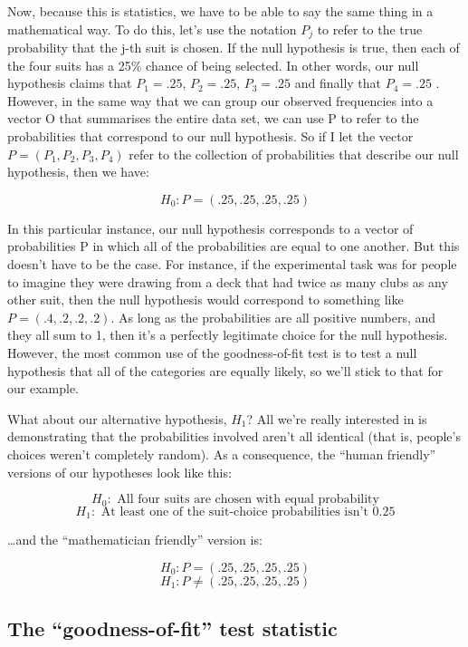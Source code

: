 \documentclass[
  a4paper,
]{book}
\begin{document}
Now, because this is statistics, we have to be able to say the same
thing in a mathematical way. To do this, let's use the notation \(P_j\)
to refer to the true probability that the j-th suit is chosen. If the
null hypothesis is true, then each of the four suits has a 25\% chance
of being selected. In other words, our null hypothesis claims that
\(P_1 = .25\), \(P_2 = .25\), \(P_3 = .25\) and finally that
\(P_4 = .25\) . However, in the same way that we can group our observed
frequencies into a vector O that summarises the entire data set, we can
use P to refer to the probabilities that correspond to our null
hypothesis. So if I let the vector \(P = (P_1, P_2, P_3, P_4)\) refer to
the collection of probabilities that describe our null hypothesis, then
we have:

\[H_0: P =(.25, .25, .25, .25)\]

In this particular instance, our null hypothesis corresponds to a vector
of probabilities P in which all of the probabilities are equal to one
another. But this doesn't have to be the case. For instance, if the
experimental task was for people to imagine they were drawing from a
deck that had twice as many clubs as any other suit, then the null
hypothesis would correspond to something like \(P = (.4, .2, .2, .2)\).
As long as the probabilities are all positive numbers, and they all sum
to 1, then it's a perfectly legitimate choice for the null hypothesis.
However, the most common use of the goodness-of-fit test is to test a
null hypothesis that all of the categories are equally likely, so we'll
stick to that for our example.

What about our alternative hypothesis, \(H_1\)? All we're really
interested in is demonstrating that the probabilities involved aren't
all identical (that is, people's choices weren't completely random). As
a consequence, the ``human friendly'' versions of our hypotheses look
like this:

\[H_0: \text{ All four suits are chosen with equal probability}\]
\[H_1: \text{ At least one of the suit-choice probabilities isn’t 0.25}\]

\ldots and the ``mathematician friendly'' version is:

\[H_0: P= (.25, .25, .25, .25)\] \[H_1: P \neq (.25, .25, .25, .25)\]

\hypertarget{the-goodness-of-fit-test-statistic}{%
\subsection{The ``goodness-of-fit'' test
statistic}\label{the-goodness-of-fit-test-statistic}}
\end{document}
